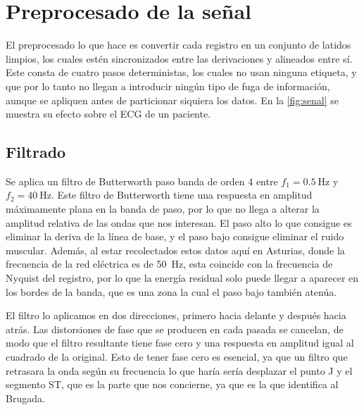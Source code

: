 \clearpage
\section{Preprocesado de la señal}\label{cap:preprocesado}

El preprocesado lo que hace es convertir cada registro en un conjunto de latidos limpios, los cuales estén sincronizados entre las derivaciones y alineados entre sí. Este consta de cuatro pasos deterministas, los cuales no usan ninguna etiqueta, y que por lo tanto no llegan a introducir ningún tipo de fuga de información, aunque se apliquen antes de particionar siquiera los datos. En la \cref{fig:senal} se muestra su efecto sobre el ECG de un paciente.


\subsection{Filtrado}

Se aplica un filtro de Butterworth paso banda de orden 4 entre $f_1 = \SI{0.5}{\hertz}$ y $f_2 = \SI{40}{\hertz}$. Este filtro de Butterworth tiene una respuesta en amplitud máximamente plana en la banda de paso, por lo que no llega a alterar la amplitud relativa de las ondas que nos interesan. El paso alto lo que consigue es eliminar la deriva de la línea de base, y el paso bajo consigue eliminar el ruido muscular. Además, al estar recolectados estos datos aquí en Asturias, donde la frecuencia de la red eléctrica es de \SI{50}{\hertz}, esta coincide con la frecuencia de Nyquist del registro, por lo que la energía residual solo puede llegar a aparecer en los bordes de la banda, que es una zona la cual el paso bajo también atenúa.

El filtro lo aplicamos en dos direcciones, primero hacia delante y después hacia atrás. Las distorsiones de fase que se producen en cada pasada se cancelan, de modo que el filtro resultante tiene fase cero y una respuesta en amplitud igual al cuadrado de la original.
Esto de tener fase cero es esencial, ya que un filtro que retrasara la onda según su frecuencia lo que haría sería desplazar el punto J y el segmento ST, que es la parte que nos concierne, ya que es la que identifica al Brugada.

